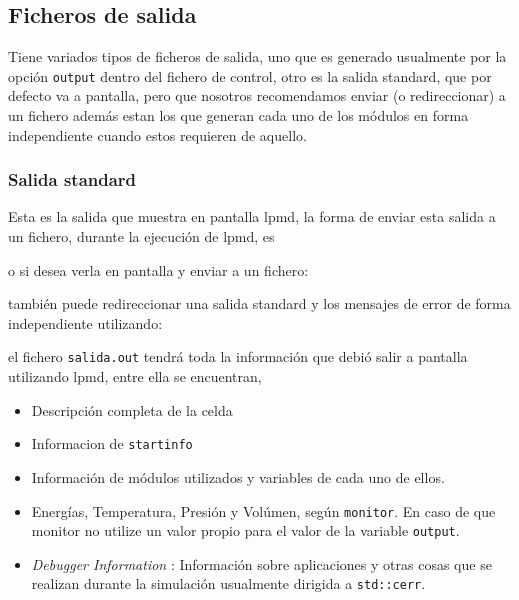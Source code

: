 \subsection{Ficheros de salida}

{\lpmd} Tiene variados tipos de ficheros de salida, uno que es generado
usualmente por la opci\'on \verb|output| dentro del fichero de control, otro es
la salida standard, que por defecto va a pantalla, pero que nosotros
recomendamos enviar (o redireccionar) a un fichero adem\'as estan los que
generan cada uno de los m\'odulos en forma independiente cuando estos requieren
de aquello.

\subsubsection{Salida standard}
Esta es la salida que muestra en pantalla lpmd, la forma de enviar esta salida a
un fichero, durante la ejecuci\'on de lpmd, es


o si desea verla en pantalla y enviar a un fichero:


tambi\'en puede redireccionar una salida standard y los mensajes de error de
forma independiente utilizando:


el fichero \verb|salida.out| tendr\'a toda la informaci\'on que debi\'o salir a
pantalla utilizando lpmd, entre ella se encuentran,

\begin{itemize}
 \item Descripci\'on completa de la celda
 \item Informacion de \verb|startinfo|
 \item Informaci\'on de m\'odulos utilizados y variables de cada uno de ellos.
 \item Energ\'ias, Temperatura, Presi\'on y Vol\'umen, seg\'un \verb|monitor|.
En caso de que monitor no utilize un valor propio para el valor de la variable
\verb|output|.
 \item \textit{Debugger Information} : Informaci\'on sobre aplicaciones y otras
cosas que se realizan durante la simulaci\'on usualmente dirigida a
\verb|std::cerr|.
\end{itemize}


